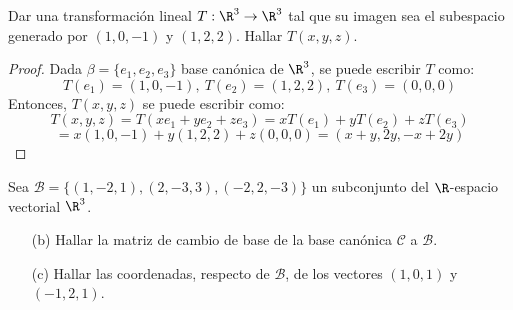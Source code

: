 \documentclass[a4,10pt]{aleph-notas}
\begin{document}
\begin{ejer}
    Dar una transformación lineal $T:\R^3\rightarrow\R^3$ tal que su imagen sea el subespacio generado por $(1,0,-1)$ y $(1,2,2)$. Hallar $T(x,y,z)$. \\
\end{ejer}
\begin{proof}
    Dada $\beta = \{ e_1,e_2,e_3 \}$ base canónica de $\R^3$, se puede escribir $T$ como:
\[ 
    T(e_1)=(1,0,-1), \ T(e_2)=(1,2,2), \ T(e_3)=(0,0,0)
\]
Entonces, $T(x,y,z)$ se puede escribir como:
\[
    T(x,y,z)=T(xe_1+ye_2+ze_3)=xT(e_1)+yT(e_2)+zT(e_3)
\]
\[
    =x(1,0,-1)+y(1,2,2)+z(0,0,0)=(x+y,2y,-x+2y)
\]
\end{proof}

\begin{ejer}
    Sea $\mathcal{B}= \{ (1,-2,1),(2,-3,3), (-2,2,-3) \}$ un subconjunto del $\R$-espacio vectorial $\R^3$.
\begin{itemize}
    \item[(b)] Hallar la matriz de cambio de base de la base canónica $\mathcal{C}$ a $\mathcal{B}$.
    \item[(c)] Hallar las coordenadas, respecto de $\mathcal{B}$, de los vectores $(1,0,1)$ y $(-1,2,1)$. 
\end{itemize}
\end{ejer}
\end{document}
